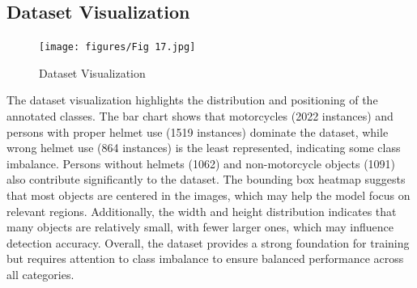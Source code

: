 \begin{refsection}
\subsection{Dataset Visualization}
\begin{figure}[ht]
    \centering
	\texttt{[image: figures/Fig 17.jpg]}
	\caption[Dataset Visualization]{Dataset Visualization}
	\label{fig:dataset_visualization}
\end{figure}

\noindent
The dataset visualization highlights the distribution and positioning of the annotated classes. The bar chart shows that motorcycles (2022 instances) and persons with proper helmet use (1519 instances) dominate the dataset, while wrong helmet use (864 instances) is the least represented, indicating some class imbalance. Persons without helmets (1062) and non-motorcycle objects (1091) also contribute significantly to the dataset. The bounding box heatmap suggests that most objects are centered in the images, which may help the model focus on relevant regions. Additionally, the width and height distribution indicates that many objects are relatively small, with fewer larger ones, which may influence detection accuracy. Overall, the dataset provides a strong foundation for training but requires attention to class imbalance to ensure balanced performance across all categories.


\end{refsection}
